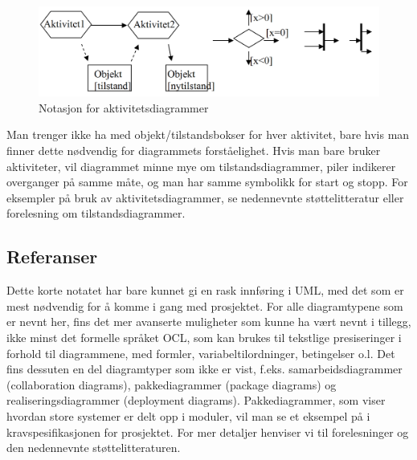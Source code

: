\begin{figure}[H]
    \centering
    \includegraphics[scale=0.35]{resources/activity-diagram-notation-example.PNG}
    \caption{Notasjon for aktivitetsdiagrammer}
    \label{fig:activity-diagram-notation-example}
\end{figure}

Man trenger ikke ha med objekt/tilstandsbokser for hver aktivitet, bare hvis man finner dette nødvendig for diagrammets forståelighet. Hvis man bare bruker aktiviteter, vil diagrammet minne mye om tilstandsdiagrammer, piler indikerer overganger på samme måte, og man har samme symbolikk for start og stopp. For eksempler på bruk av aktivitetsdiagrammer, se nedennevnte støttelitteratur eller forelesning om tilstandsdiagrammer.

\subsection{Referanser}

Dette korte notatet har bare kunnet gi en rask innføring i UML, med det som er mest nødvendig for å komme i gang med prosjektet. For alle diagramtypene som er nevnt her, fins det mer avanserte muligheter som kunne ha vært nevnt i tillegg, ikke minst det formelle språket OCL, som kan brukes til tekstlige presiseringer i forhold til diagrammene, med formler, variabeltilordninger, betingelser o.l. Det fins dessuten en del diagramtyper som ikke er vist, f.eks. samarbeidsdiagrammer (collaboration diagrams), pakkediagrammer (package diagrams) og realiseringsdiagrammer (deployment diagrams). Pakkediagrammer, som viser hvordan store systemer er delt opp i moduler, vil man se et eksempel på i kravspesifikasjonen for prosjektet. For mer detaljer henviser vi til forelesninger og den nedennevnte støttelitteraturen.

